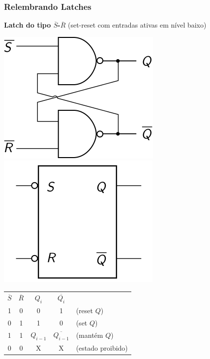 \documentclass{beamer}
\newcommand{\Not}[1]{\overline{#1}}
\begin{document}
\begin{frame}
\frametitle{Relembrando Latches}

\textbf{Latch do tipo $\Not{S}$-$\Not{R}$} (set-reset com entradas ativas em nível baixo)

\begin{center}
\includegraphics{images/latchRSnand_circuit}
\hspace{6ex}
\raisebox{40pt}{\Huge$=$}
\hspace{6ex}
\includegraphics{images/latchRSnand_blackbox}\\

\vspace{12pt}

\begin{tabular}{cc||ccl}
$\Not{S}$ & $\Not{R}$ & $Q_i$ & $\Not{Q_i}$ \\
\cline{1-4}
 1  &  0  &   0   &     1       & (reset $Q$) \\
 0  &  1  &   1   &     0       & (set $Q$) \\
 1  &  1  & $Q_{i-1}$ & $\Not{Q_{i-1}}$ & (mantém $Q$) \\
 0  &  0  &   X   &     X       & (estado proibido)
\end{tabular}
\end{center}
\end{frame}
\end{document}
